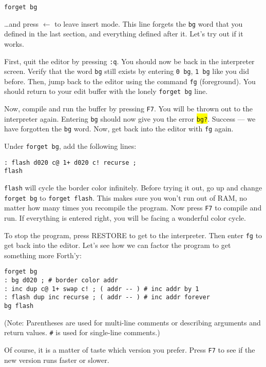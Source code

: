 \begin{verbatim}
forget bg
\end{verbatim}

\ldots and press $\leftarrow$ to leave insert mode. This line forgets the \texttt{bg} word that you defined in the last section, and everything defined after it. Let's try out if it works.

First, quit the editor by pressing \texttt{:q}. You should now be back in the interpreter screen. Verify that the word \texttt{bg} still exists by  entering \texttt{0 bg}, \texttt{1 bg} like you did before. Then, jump back to the editor using the command \texttt{fg} (foreground). You should return to your edit buffer with the lonely \texttt{forget bg} line.

Now, compile and run the buffer by pressing \texttt{F7}. You will be thrown out to the interpreter again. Entering \texttt{bg} should now give you the error \colorbox{yellow}{\texttt{bg?}}. Success --- we have forgotten the \texttt{bg} word. Now, get back into the editor with \texttt{fg} again.

Under \texttt{forget bg}, add the following lines:

\begin{verbatim}
: flash d020 c@ 1+ d020 c! recurse ;
flash
\end{verbatim}

\texttt{flash} will cycle the border color infinitely. Before trying it out, go up and change \texttt{forget bg} to \texttt{forget flash}. This makes sure you won't run out of RAM, no matter how many times you recompile the program. Now press \texttt{F7} to compile and run. If everything is entered right, you will be facing a wonderful color cycle.

To stop the program, press RESTORE to get to the interpreter. Then enter \texttt{fg} to get back into the editor. Let's see how we can factor the program to get something more Forth'y:

\begin{verbatim}
forget bg
: bg d020 ; # border color addr
: inc dup c@ 1+ swap c! ; ( addr -- ) # inc addr by 1
: flash dup inc recurse ; ( addr -- ) # inc addr forever
bg flash
\end{verbatim}

(Note: Parentheses are used for multi-line comments or describing arguments and return values. \texttt{\#} is used for single-line comments.)

Of course, it is a matter of taste which version you prefer. Press \texttt{F7} to see if the new version runs faster or slower.

